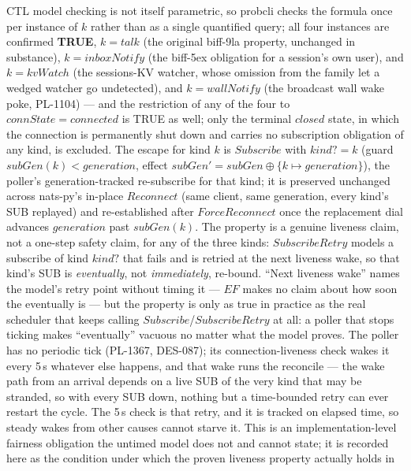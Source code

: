 \documentclass[a4paper,10pt,fleqn]{article}
\begin{document}
\begin{enumerate}
    CTL model checking is not itself parametric, so probcli checks the
    formula once per instance of $k$ rather than as a single quantified
    query; all four instances are confirmed \textbf{TRUE}, $k = talk$
    (the original biff-9la property, unchanged in substance), $k =
    inboxNotify$ (the biff-5ex obligation for a session's own user), and
    $k = kvWatch$ (the sessions-KV watcher, whose omission from the
    family let a wedged watcher go undetected), and $k = wallNotify$ (the
    broadcast wall wake poke, PL-1104) --- and the restriction of
    any of the four to
    $connState = connected$ is TRUE as well; only the terminal $closed$
    state, in which the connection is permanently shut down and carries
    no subscription obligation of any kind, is excluded.  The escape for
    kind $k$ is $Subscribe$ with $kind? = k$ (guard $subGen(k) <
    generation$, effect $subGen' = subGen \oplus \{ k \mapsto generation
    \}$), the poller's generation-tracked re-subscribe for that kind; it
    is preserved unchanged across nats-py's in-place $Reconnect$ (same
    client, same generation, every kind's SUB replayed) and
    re-established after $ForceReconnect$ once the replacement dial
    advances $generation$ past $subGen(k)$.  The property is a genuine
    liveness claim, not a one-step safety claim, for any of the three
    kinds: $SubscribeRetry$ models a subscribe of kind $kind?$ that fails
    and is retried at the next liveness wake, so that kind's SUB is \emph{eventually},
    not \emph{immediately}, re-bound.  ``Next liveness wake'' names the model's
    retry point without timing it --- $EF$ makes no claim about how soon
    the eventually is --- but the property is only as true in practice as
    the real scheduler that keeps calling $Subscribe$/$SubscribeRetry$ at
    all: a poller that stops ticking makes ``eventually'' vacuous no
    matter what the model proves.  The poller has no periodic tick
    (PL-1367, DES-087); its connection-liveness check wakes it every 5\,s
    whatever else happens, and that wake runs the reconcile --- the wake path
    from an arrival depends on a live SUB of the very kind that may be
    stranded, so with every SUB down, nothing but a time-bounded retry can
    ever restart the cycle.  The 5\,s check is that retry, and it is tracked
    on elapsed time, so steady wakes from other causes cannot starve it.  This is an implementation-level fairness obligation the
    untimed model does not and cannot state; it is recorded here as the
    condition under which the proven liveness property actually holds in

\end{enumerate}
\end{document}
